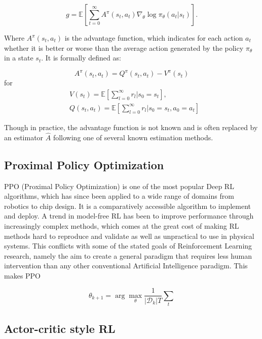 \[
g = \mathbb{E}
\left[\sum^{\infty}_{t=0} A^{\pi}(s_t, a_t) \nabla_{\theta}\log\pi_{\theta}(a_t | s_t) \right].
\]


Where $A^{\pi}(s_t, a_t)$ is the advantage function, which indicates for each action $a_t$ whether it is better or worse than the average action generated by the policy $\pi_{\theta}$ in a state $s_t$. It is formally defined as:

\begin{equation}
A^\pi(s_t,a_t) = Q^\pi(s_t, a_t) - V^\pi(s_t)
\end{equation}
for
\begin{align*}
&V(s_t) = \mathbb{E}\left[\sum_{l=0}^{\infty} r_l | s_0 = s_t \right],\\
&Q(s_t, a_t) = \mathbb{E}\left[\sum_{l=0}^{\infty} r_l | s_0 = s_t, a_0 = a_t \right]
\end{align*}

Though in practice, the advantage function is not known and is often replaced by an estimator $\hat{A}$ following one of several known estimation methods.

\subsection{Proximal Policy Optimization}

PPO (Proximal Policy Optimization\cite{schulman2017proximal}) is one of the most popular Deep RL algorithms, which has since been applied to a wide range of domains from robotics\cite{andrychowicz2020learning} to chip design\cite{mirhoseini2021graph}. It is a comparatively accessible algorithm to implement and deploy. A trend in model-free RL has been to improve performance through increasingly complex methods, which comes at the great cost of making RL methods hard to reproduce and validate as well as unpractical to use in physical systems. This conflicts with some of the stated goals of Reinforcement Learning research, namely the aim to create a general paradigm that requires less human intervention than any other conventional Artificial Intelligence paradigm. This makes PPO

\[
\theta_{k+1} = \arg \max_{\theta} \frac{1}{|\mathcal{D}_k|T}\sum_{t}
\] 


\subsection{Actor-critic style RL}


